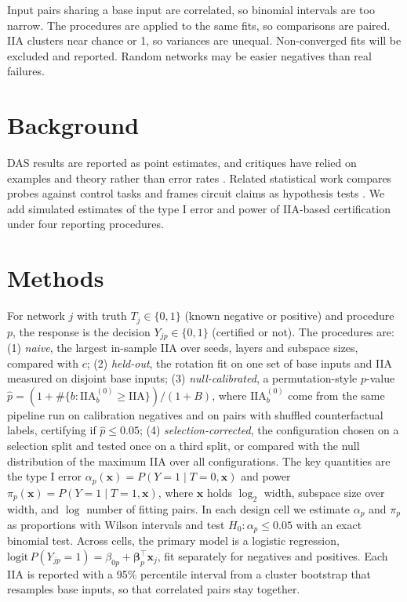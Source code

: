 \documentclass[11pt]{article}
\begin{document}
Input pairs sharing a base input are correlated, so binomial intervals are too narrow.
The procedures are applied to the same fits, so comparisons are paired. IIA clusters
near chance or 1, so variances are unequal. Non-converged fits will be excluded and
reported. Random networks may be easier negatives than real failures.

\section{Background}
DAS results are reported as point estimates, and critiques have relied on examples and
theory rather than error rates \citep{makelov2023subspacelookingforinterpretability,
sutter2025nonlinear}. Related statistical work compares probes against control tasks
\citep{hewitt2019control} and frames circuit claims as hypothesis tests
\citep{shi2024hypothesis}. We add simulated estimates of the type I error and power of
IIA-based certification under four reporting procedures.

\section{Methods}
For network $j$ with truth $T_j \in \{0,1\}$ (known negative or positive) and procedure
$p$, the response is the decision $Y_{jp} \in \{0,1\}$ (certified or not). The
procedures are: (1) \emph{naive}, the largest in-sample IIA over seeds, layers and
subspace sizes, compared with $c$; (2) \emph{held-out}, the rotation fit on one set of
base inputs and IIA measured on disjoint base inputs; (3) \emph{null-calibrated}, a
permutation-style $p$-value $\hat p = (1 + \#\{b: \mathrm{IIA}^{(0)}_b \geq
\mathrm{IIA}\})/(1+B)$, where $\mathrm{IIA}^{(0)}_b$ come from the same pipeline run on
calibration negatives and on pairs with shuffled counterfactual labels, certifying if
$\hat p \leq 0.05$; (4) \emph{selection-corrected}, the configuration chosen on a
selection split and tested once on a third split, or compared with the null
distribution of the maximum IIA over all configurations. The key quantities are the
type I error $\alpha_p(\mathbf{x}) = P(Y=1 \mid T=0, \mathbf{x})$ and power
$\pi_p(\mathbf{x}) = P(Y=1 \mid T=1, \mathbf{x})$, where $\mathbf{x}$ holds
$\log_2$ width, subspace size over width, and $\log$ number of fitting pairs. In each
design cell we estimate $\alpha_p$ and $\pi_p$ as proportions with Wilson intervals and
test $H_0\!: \alpha_p \leq 0.05$ with an exact binomial test. Across cells, the primary
model is a logistic regression, $\mathrm{logit}\,P(Y_{jp}=1) = \beta_{0p} +
\boldsymbol{\beta}_p^\top \mathbf{x}_j$, fit separately for negatives and positives.
Each IIA is reported with a 95\% percentile
interval from a cluster bootstrap that resamples base inputs, so that correlated pairs
stay together.
\end{document}
